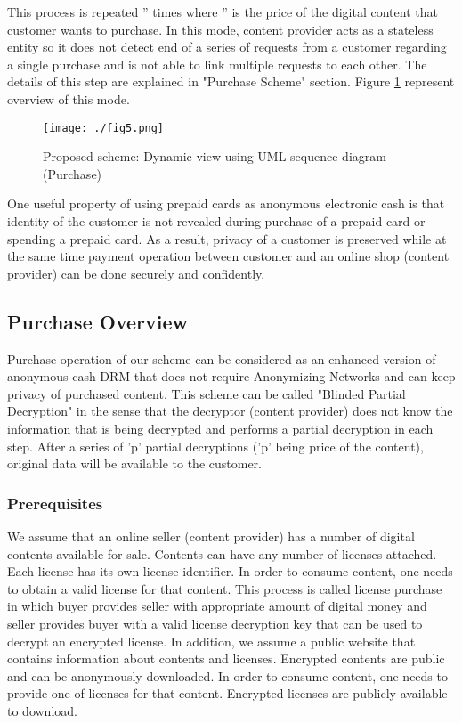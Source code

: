 \documentclass[times]{secauth}
\begin{document}
This process is repeated '' times where '' is the price of the digital content that customer wants to purchase. In this mode, content provider acts as a stateless entity so it does not detect end of a series of requests from a customer regarding a single purchase and is not able to link multiple requests to each other. The details of this step are explained in "Purchase Scheme" section. Figure \ref{fig_dynamic} represent overview of this mode.

\begin{figure}
\centering
\texttt{[image: ./fig5.png]}
\caption{Proposed scheme: Dynamic view using UML sequence diagram (Purchase)}
\label{fig_dynamic}
\end{figure}

One useful property of using prepaid cards as anonymous electronic cash is that identity of the customer is not revealed during purchase of a prepaid card or spending a prepaid card. As a result, privacy of a customer is preserved while at the same time payment operation between customer and an online shop (content provider) can be done securely and confidently.

\subsection{Purchase Overview}
Purchase operation of our scheme can be considered as an enhanced version of anonymous-cash DRM that does not require Anonymizing Networks and can keep privacy of purchased content. This scheme can be called "Blinded Partial Decryption" in the sense that the decryptor (content provider) does not know the information that is being decrypted and performs a partial decryption in each step. After a series of 'p' partial decryptions ('p' being price of the content), original data will be available to the customer.

\subsubsection{Prerequisites}
We assume that an online seller (content provider) has a number of digital contents available for sale. Contents can have any number of licenses attached. Each license has its own license identifier. In order to consume content, one needs to obtain a valid license for that content. This process is called license purchase in which buyer provides seller with appropriate amount of digital money and seller provides buyer with a valid license decryption key that can be used to decrypt an encrypted license.
In addition, we assume a public website that contains information about contents and licenses. Encrypted contents are public and can be anonymously downloaded. In order to consume content, one needs to provide one of licenses for that content. Encrypted licenses are publicly available to download.
\end{document}
